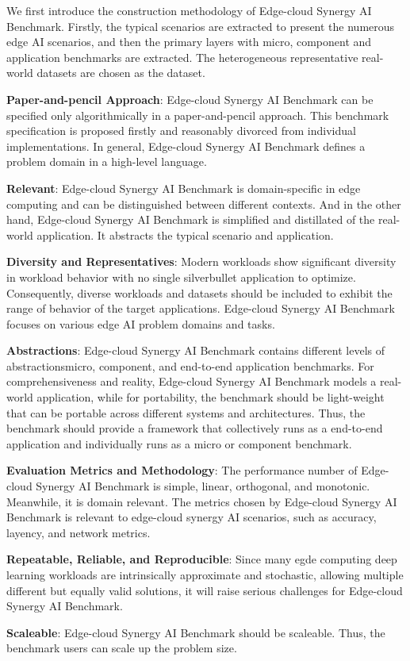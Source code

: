 We first introduce the construction methodology of Edge-cloud Synergy AI Benchmark. Firstly, the typical scenarios are
extracted to present the numerous edge AI scenarios, and then the primary layers with micro, component and application benchmarks are extracted. The heterogeneous representative real-world
datasets are chosen as the dataset.

\textbf{Paper-and-pencil Approach}: Edge-cloud Synergy AI Benchmark can be specified only algorithmically in a paper-and-pencil approach. This benchmark specification is proposed firstly and reasonably divorced from individual implementations. In general, Edge-cloud Synergy AI Benchmark defines a problem domain in a high-level language.

\textbf{Relevant}: Edge-cloud Synergy AI Benchmark is domain-specific in edge computing and can be distinguished between different contexts. And in the other hand, Edge-cloud Synergy AI Benchmark is simplified and distillated of the real-world application. It abstracts the typical scenario and application.

\textbf{Diversity and Representatives}: Modern workloads show significant diversity in workload behavior with no single silverbullet application to optimize. Consequently, diverse workloads and datasets should be included to exhibit the range of behavior of the target applications. Edge-cloud Synergy AI Benchmark focuses on various edge AI problem domains and tasks.

\textbf{Abstractions}: Edge-cloud Synergy AI Benchmark contains different levels of abstractionsmicro, component, and end-to-end application benchmarks. For comprehensiveness and reality, Edge-cloud Synergy AI Benchmark models a real-world application, while for portability, the benchmark should be light-weight that can be portable across different systems and architectures. Thus, the benchmark should provide a framework that collectively runs as a end-to-end application and individually runs as a micro or component benchmark.

\textbf{Evaluation Metrics and Methodology}: The performance number of Edge-cloud Synergy AI Benchmark is simple, linear, orthogonal, and monotonic. Meanwhile, it is domain relevant. The metrics chosen by Edge-cloud Synergy AI Benchmark is relevant to edge-cloud synergy AI scenarios, such as accuracy, layency, and network metrics.

\textbf{Repeatable, Reliable, and Reproducible}: Since many egde computing deep learning workloads are intrinsically approximate and stochastic, allowing multiple different but equally valid solutions, it will raise serious challenges for Edge-cloud Synergy AI Benchmark.

\textbf{Scaleable}: Edge-cloud Synergy AI Benchmark should be scaleable. Thus, the benchmark users can scale up the problem size.